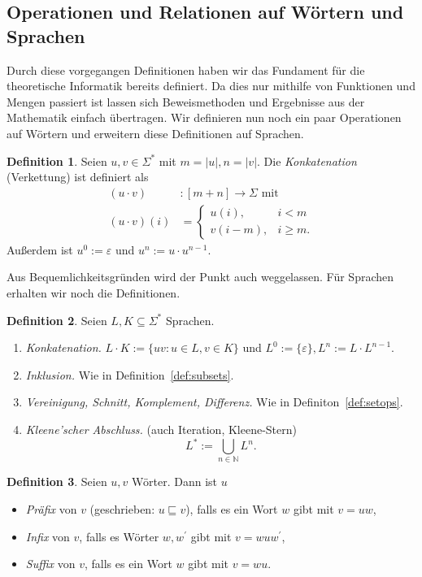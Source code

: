 \documentclass[11pt, a4paper]{article}
\theoremstyle{definition}
\newtheorem{definition}{Definition}[section]
\theoremstyle{plain}
\numberwithin{equation}{section}
\begin{document}
\subsection{Operationen und Relationen auf Wörtern und Sprachen}\label{sec:awl_wordops}
Durch diese vorgegangen Definitionen haben wir das Fundament für die theoretische Informatik bereits definiert. Da dies nur mithilfe von Funktionen und Mengen  passiert ist lassen sich Beweismethoden und Ergebnisse aus der Mathematik einfach übertragen. Wir definieren nun noch ein paar Operationen auf Wörtern und erweitern diese Definitionen auf Sprachen.
\begin{definition}
	Seien \( u, v \in \Sigma^\ast \) mit \( m = \left| u \right|, n = \left| v \right| \). Die \textit{Konkatenation} (Verkettung) ist definiert als
	\begin{align*}
		(u \cdot v)&: [m{+}n] \to \Sigma \text{ mit}\\
		(u \cdot v)(i) &= \left\lbrace \begin{array}{ll}u(i), & i < m\\ v(i-m), & i \geq m. \end{array} \right.
	\end{align*}
	Außerdem ist \( u^0 := \varepsilon \) und \( u^n := u \cdot u^{n-1} \).
\end{definition}
Aus Bequemlichkeitsgründen wird der Punkt auch weggelassen. Für Sprachen erhalten wir noch die Definitionen.
\begin{definition}
	Seien \( L, K \subseteq \Sigma^\ast \) Sprachen.
	\begin{enumerate}
		\item \textit{Konkatenation.} \( L \cdot K := \{ uv : u \in L, v \in K \} \) und \( L^0 := \{ \varepsilon \}, L^n := L \cdot L^{n-1} \).
		\item \textit{Inklusion.} Wie in Definition~\ref{def:subsets}.
		\item \textit{Vereinigung, Schnitt, Komplement, Differenz.} Wie in Definiton~\ref{def:setops}.
		\item \textit{Kleene'scher Abschluss.} (auch Iteration, Kleene-Stern)
			\[
				L^\ast := \bigcup_{n \in \mathbb{N}} L^n.
			\]
	\end{enumerate}
\end{definition}
\begin{definition}
	Seien \( u, v \) Wörter. Dann ist \( u \)
	\begin{itemize}
		\item \textit{Präfix} von \( v \) (geschrieben: \( u \sqsubseteq v \)), falls es ein Wort \( w \) gibt mit \( v = uw \),
		\item \textit{Infix} von \( v \), falls es Wörter \( w, w^\prime \) gibt mit \( v = wuw^\prime \),
		\item \textit{Suffix} von \( v \), falls es ein Wort \( w \) gibt mit \( v = wu \).
	\end{itemize}
\end{definition}
\end{document}
